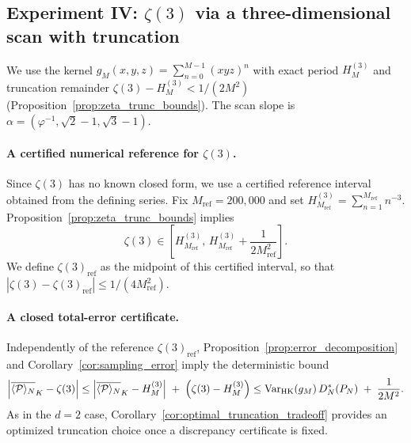 \subsection{Experiment IV: \texorpdfstring{$\zeta(3)$}{zeta(3)} via a three-dimensional scan with truncation}
\label{sec:exp_zeta3}

We use the kernel $g_M(x,y,z)=\sum_{n=0}^{M-1}(xyz)^n$ with exact period $H_M^{(3)}$ and truncation remainder $\zeta(3)-H_M^{(3)}<1/(2M^2)$ (Proposition~\ref{prop:zeta_trunc_bounds}). The scan slope is $\alpha=(\varphi^{-1},\sqrt{2}-1,\sqrt{3}-1)$.

\paragraph{A certified numerical reference for $\zeta(3)$.}
Since $\zeta(3)$ has no known closed form, we use a certified reference interval obtained from the defining series. Fix $M_{\mathrm{ref}}=200{,}000$ and set $H^{(3)}_{M_{\mathrm{ref}}}=\sum_{n=1}^{M_{\mathrm{ref}}}n^{-3}$. Proposition~\ref{prop:zeta_trunc_bounds} implies
\[
\zeta(3)\in\left[H^{(3)}_{M_{\mathrm{ref}}},\,H^{(3)}_{M_{\mathrm{ref}}}+\frac{1}{2M_{\mathrm{ref}}^2}\right].
\]
We define $\zeta(3)_{\mathrm{ref}}$ as the midpoint of this certified interval, so that $|\zeta(3)-\zeta(3)_{\mathrm{ref}}|\le 1/(4M_{\mathrm{ref}}^2)$.

\paragraph{A closed total-error certificate.}
Independently of the reference $\zeta(3)_{\mathrm{ref}}$, Proposition~\ref{prop:error_decomposition} and Corollary~\ref{cor:sampling_error} imply the deterministic bound
\[
\left|\overline{\langle \mathcal{P} \rangle_N}_K-\zeta(3)\right|
\le
\left|\overline{\langle \mathcal{P} \rangle_N}_K-H_M^{(3)}\right|
\;+\;\left(\zeta(3)-H_M^{(3)}\right)
\le
\mathrm{Var}_{\mathrm{HK}}(g_M)\,D_N^\ast(P_N)
\;+\;\frac{1}{2M^2}.
\]
As in the $d=2$ case, Corollary~\ref{cor:optimal_truncation_tradeoff} provides an optimized truncation choice once a discrepancy certificate is fixed.

